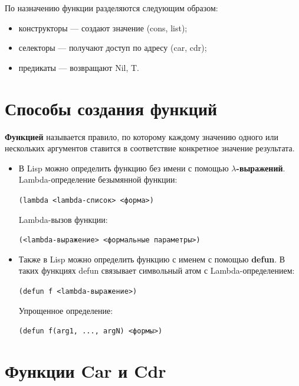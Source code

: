 \documentclass[a4paper,14pt, unknownkeysallowed]{extreport}
\begin{document}
По назначению функции разделяются следующим образом:

\begin{itemize}
	\item конструкторы — создают значение (cons, list);
	\item селекторы — получают доступ по адресу (car, cdr); 
	\item предикаты — возвращают Nil, T.
\end{itemize}

\section{Способы создания функций}

\textbf{Функцией} называется правило, по которому каждому значению одного или нескольких аргументов ставится в соответствие конкретное значение результата.

\begin{itemize}
	\item В Lisp можно определить функцию без имени с помощью \textbf{$\lambda$-выражений}. 
	Lambda-определение безымянной функции:
	
	\begin{center}
	\texttt{(lambda <lambda-список> <форма>)}
	\end{center}

	Lambda-вызов функции:

	\begin{center}
	\texttt{(<lambda-выражение> <формальные параметры>)}
	\end{center}

	\item Также в Lisp можно определить функцию с именем с помощью \textbf{defun}. В таких функциях defun связывает символьный атом с Lambda-определением:
	
	\begin{center}
	\texttt{(defun f <lambda-выражение>)}
	\end{center}

	Упрощенное определение:

	\begin{center}
	\texttt{(defun f(arg1, ..., argN) <формы>)}
	\end{center}

\end{itemize}

\section{Функции Car и Cdr}
\end{document}

